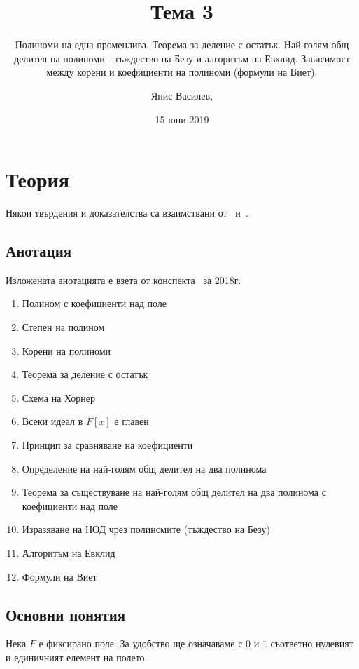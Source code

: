 \documentclass[numbers=endperiod, DIV=15, bibliography=totocnumbered]{scrartcl}
\title{Тема 3}
\subtitle{Полиноми на една променлива. Теорема за деление с остатък. Най-голям общ делител на полиноми - тъждество на Безу и алгоритъм на Евклид. Зависимост между корени и коефициенти на полиноми (формули на Виет).}
\author{Янис Василев, \Email{ianis@ivasilev.net}}
\date{15 юни 2019}
\begin{document}
\maketitle

\section{Теория}

Някои твърдения и доказателства са взаимствани от~\cite{Knapp} и~\cite{RoyachkiNotes}.

\subsection{Анотация}

Изложената анотацията е взета от конспекта~\cite{Syllabus} за 2018г.

\begin{enumerate}
  \item Полином с коефициенти над поле
  \item Степен на полином
  \item Корени на полиноми
  \item Теорема за деление с остатък
  \item Схема на Хорнер
  \item Всеки идеал в $F[x]$ е главен
  \item Принцип за сравняване на коефициенти
  \item Определение на най-голям общ делител на два полинома
  \item Теорема за съществуване на най-голям общ делител на два полинома с коефициенти над поле
  \item Изразяване на НОД чрез полиномите (тъждество на Безу)
  \item Алгоритъм на Евклид
  \item Формули на Виет
\end{enumerate}

\subsection{Основни понятия}

Нека $F$ е фиксирано поле. За удобство ще означаваме с $0$ и $1$ съответно нулевият и единичният елемент на полето.
\end{document}

